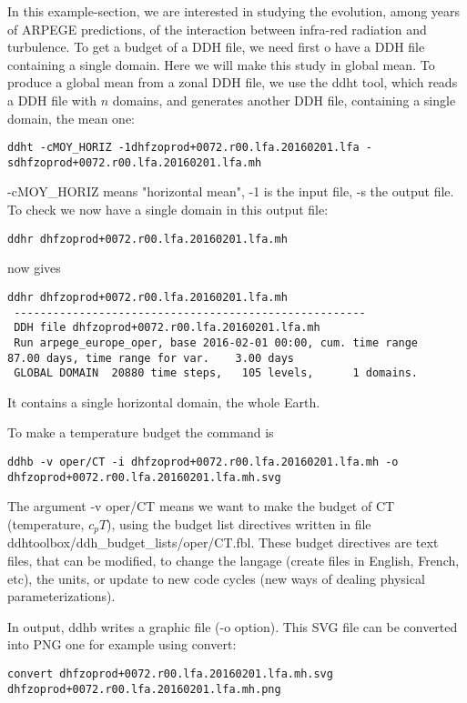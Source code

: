 \p In this example-section, we are interested in studying the evolution, among years of ARPEGE predictions, of the interaction between infra-red radiation and turbulence. To get a budget of a DDH file, we need first o have a DDH file containing a single domain. Here we will make this study in global mean. To produce a global mean from a zonal DDH file, we use the ddht tool, which reads a DDH file with $n$ domains, and generates another DDH file, containing a single domain, the mean one:

{\small \begin{verbatim} 
ddht -cMOY_HORIZ -1dhfzoprod+0072.r00.lfa.20160201.lfa -sdhfzoprod+0072.r00.lfa.20160201.lfa.mh
\end{verbatim}}
\noi -cMOY\_HORIZ means "horizontal mean", -1 is the input file, -s the output file. To check we now have a single domain in this output file:
{\small \begin{verbatim} 
ddhr dhfzoprod+0072.r00.lfa.20160201.lfa.mh
\end{verbatim}}
\noi now gives
{\small \begin{verbatim} 
ddhr dhfzoprod+0072.r00.lfa.20160201.lfa.mh
 ------------------------------------------------------
 DDH file dhfzoprod+0072.r00.lfa.20160201.lfa.mh
 Run arpege_europe_oper, base 2016-02-01 00:00, cum. time range    87.00 days, time range for var.    3.00 days
 GLOBAL DOMAIN  20880 time steps,   105 levels,      1 domains.
\end{verbatim}}
\noi It contains a single horizontal domain, the whole Earth.

\p To make a temperature budget the command is
{\tiny \begin{verbatim} 
ddhb -v oper/CT -i dhfzoprod+0072.r00.lfa.20160201.lfa.mh -o dhfzoprod+0072.r00.lfa.20160201.lfa.mh.svg
\end{verbatim}}
\noi The argument -v oper/CT means we want to make the budget of CT (temperature, $c_p T$), using the budget list directives written in file ddhtoolbox/ddh\_budget\_lists/oper/CT.fbl. These budget directives are text files, that can be modified, to change the langage (create files in English, French, etc), the units, or update to new code cycles (new ways of dealing physical parameterizations).

\p In output, ddhb writes a graphic file (-o option). This SVG file can be converted into PNG one for example using convert:
{\small \begin{verbatim} 
convert dhfzoprod+0072.r00.lfa.20160201.lfa.mh.svg dhfzoprod+0072.r00.lfa.20160201.lfa.mh.png
\end{verbatim}}

